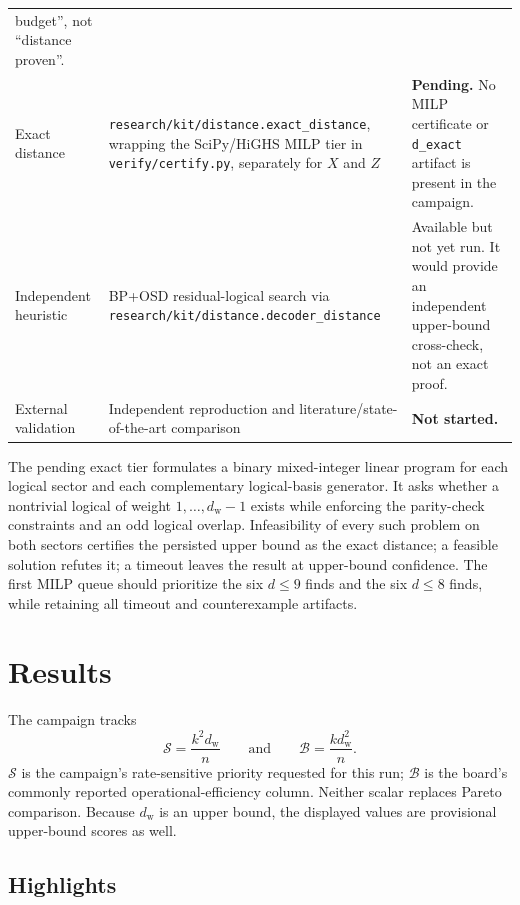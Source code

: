 \documentclass[11pt]{article}
\newcommand{\dw}{d_{\mathrm w}}
\newcommand{\score}{\mathcal{S}}
\newcommand{\boardfom}{\mathcal{B}}
\newcommand{\pathcode}[1]{\nolinkurl{#1}}
\begin{document}
\begin{longtable}{@{}L{3.15cm}L{5.2cm}L{5.4cm}@{}}
  budget'', not ``distance proven''. \\
\addlinespace
Exact distance
& \pathcode{research/kit/distance.exact_distance}, wrapping the
  SciPy/HiGHS MILP tier in \pathcode{verify/certify.py}, separately for
  $X$ and $Z$
& \textbf{Pending.}  No MILP certificate or \pathcode{d_exact} artifact is
  present in the campaign. \\
\addlinespace
Independent heuristic
& BP+OSD residual-logical search via
  \pathcode{research/kit/distance.decoder_distance}
& Available but not yet run.  It would provide an independent upper-bound
  cross-check, not an exact proof. \\
\addlinespace
External validation
& Independent reproduction and literature/state-of-the-art comparison
& \textbf{Not started.} \\
\end{longtable}
\normalsize

The pending exact tier formulates a binary mixed-integer linear program for
each logical sector and each complementary logical-basis generator.  It asks
whether a nontrivial logical of weight $1,\ldots,\dw-1$ exists while enforcing
the parity-check constraints and an odd logical overlap.  Infeasibility of
every such problem on both sectors certifies the persisted upper bound as the
exact distance; a feasible solution refutes it; a timeout leaves the result
at upper-bound confidence.  The first MILP queue should prioritize the six
$d\leq9$ finds and the six $d\leq8$ finds, while retaining all timeout and
counterexample artifacts.

\section{Results}

The campaign tracks
\[
  \score=\frac{k^2\dw}{n}
  \qquad\text{and}\qquad
  \boardfom=\frac{k\dw^2}{n}.
\]
$\score$ is the campaign's rate-sensitive priority requested for this run;
$\boardfom$ is the board's commonly reported operational-efficiency column.
Neither scalar replaces Pareto comparison.  Because $\dw$ is an upper bound,
the displayed values are provisional upper-bound scores as well.

\subsection{Highlights}
\end{document}

